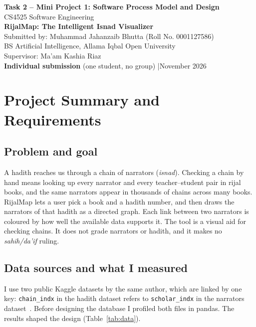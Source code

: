 \documentclass[11pt,a4paper]{article}
\begin{document}
\begin{center}
    {\Large \textbf{Task 2 -- Mini Project 1: Software Process Model and Design}}\\[0.25cm]
    {\large CS4525 Software Engineering}\\[0.25cm]
    {\large \textbf{RijalMap: The Intelligent Isnad Visualizer}}\\[0.25cm]
    Submitted by: Muhammad Jahanzaib Bhutta (Roll No. 0001127586)\\
    BS Artificial Intelligence, Allama Iqbal Open University\\
    Supervisor: Ma'am Kashia Riaz\\
    \textbf{Individual submission} (one student, no group) \quad|\quad November 2026
\end{center}
\vspace{0.2cm}

\section{Project Summary and Requirements}
\subsection{Problem and goal}
A hadith reaches us through a chain of narrators (\emph{isnad}). Checking a chain by hand means looking up every narrator and every teacher--student pair in rijal books, and the same narrators appear in thousands of chains across many books. RijalMap lets a user pick a book and a hadith number, and then draws the narrators of that hadith as a directed graph. Each link between two narrators is coloured by how well the available data supports it. The tool is a visual aid for checking chains. It does not grade narrators or hadith, and it makes no \emph{sahih/da'if} ruling.

\subsection{Data sources and what I measured}
I use two public Kaggle datasets by the same author, which are linked by one key: \texttt{chain\_indx} in the hadith dataset refers to \texttt{scholar\_indx} in the narrators dataset~\cite{narrators,hadiths}. Before designing the database I profiled both files in pandas. The results shaped the design (Table~\ref{tab:data}).
\end{document}
